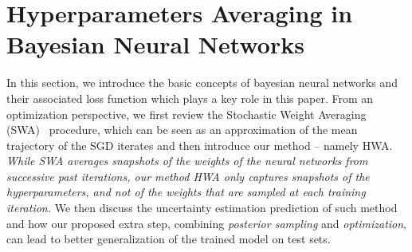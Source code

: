 \documentclass[tablecaption=bottom,wcp]{jmlr}
\begin{document}
\section{Hyperparameters Averaging in Bayesian Neural Networks}\label{sec:main}

In this section, we introduce the basic concepts of bayesian neural networks and their associated loss function which plays a key role in this paper.
From an optimization perspective, we first review the Stochastic Weight Averaging (SWA)~\citep{izmailov2018averaging} procedure, which can be seen as an approximation of the mean trajectory of the SGD iterates and then introduce our method -- namely \textsc{HWA}.
\textit{While SWA averages snapshots of the weights of the neural networks from successive past iterations, our method HWA only captures snapshots of the hyperparameters, and not of the weights that are sampled at each training iteration.}
We then discuss the uncertainty estimation prediction of such method and how our proposed extra step, combining \emph{posterior sampling} and \emph{optimization}, can lead to better generalization of the trained model on test sets.
\end{document}
